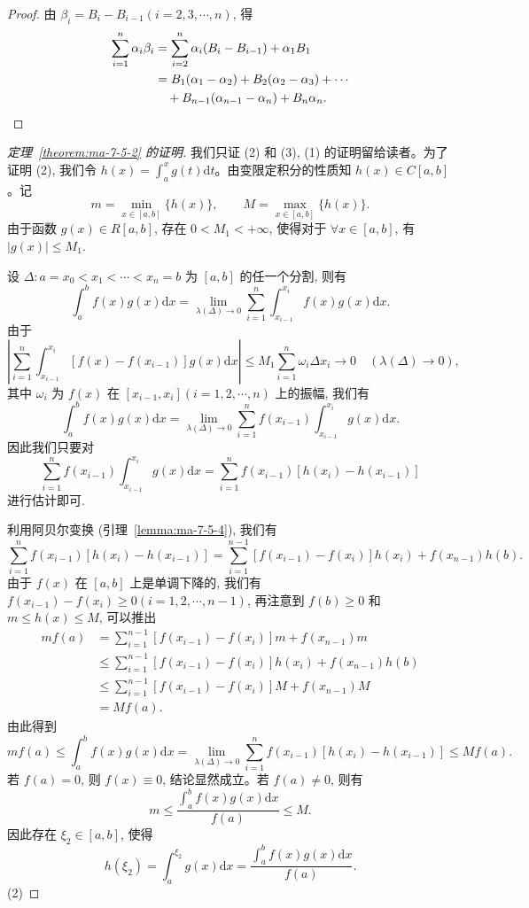 \begin{proof}
由 $\beta_i=B_i-B_{i-1}(i=2,3,\cdots,n)$, 得
\[
\begin{aligned}
  \sum_{i=1}^n\alpha_i\beta_i
  &=\sum_{i=2}^n\alpha_i(B_i-B_{i-1})+\alpha_1B_1\\
  &=B_1(\alpha_1-\alpha_2)+B_2(\alpha_2-\alpha_3)+\cdots\\
  &\quad+B_{n-1}(\alpha_{n-1}-\alpha_n)+B_n\alpha_n.
\end{aligned}
\qedhere
\]
\end{proof}


\begin{proof}[{定理~\ref{theorem:ma-7-5-2} 的证明}]
我们只证 (2) 和 (3), (1) 的证明留给读者。为了证明 (2), 我们令 $h(x)=\int_a^x g(t)\mathrm dt$。由变限定积分的性质知 $h(x)\in C[a,b]$。记
\[
  m=\min_{x\in[a,b]}\{h(x)\},\qquad
  M=\max_{x\in[a,b]}\{h(x)\}.
\]
由于函数 $g(x)\in R[a,b]$, 存在 $0<M_1<+\infty$, 使得对于 $\forall x\in[a,b]$, 有 $|g(x)|\leq M_1$.

设 $\Delta:a=x_0<x_1<\cdots<x_n=b$ 为 $[a,b]$ 的任一个分割, 则有
\[
  \int_a^b f(x)g(x)\mathrm dx
  =\lim_{\lambda(\Delta)\to0}\sum_{i=1}^n\int_{x_{i-1}}^{x_i} f(x)g(x)\mathrm dx.
\]
由于
\[
  \left|\sum_{i=1}^n\int_{x_{i-1}}^{x_i}[f(x)-f(x_{i-1})]g(x)\mathrm dx\right|
  \leq M_1\sum_{i=1}^n\omega_i\Delta x_i\to0\quad(\lambda(\Delta)\to0),
\]
其中 $\omega_i$ 为 $f(x)$ 在 $[x_{i-1},x_i](i=1,2,\cdots,n)$ 上的振幅, 我们有
\[
  \int_a^b f(x)g(x)\mathrm dx
  =\lim_{\lambda(\Delta)\to0}\sum_{i=1}^n f(x_{i-1})\int_{x_{i-1}}^{x_i}g(x)\mathrm dx.
\]
因此我们只要对
\[
  \sum_{i=1}^n f(x_{i-1})\int_{x_{i-1}}^{x_i}g(x)\mathrm dx
  =\sum_{i=1}^n f(x_{i-1})[h(x_i)-h(x_{i-1})]
\]
进行估计即可.

利用阿贝尔变换 (引理~\ref{lemma:ma-7-5-4}), 我们有
\[
\sum_{i=1}^n f(x_{i-1})[h(x_i)-h(x_{i-1})]
=\sum_{i=1}^{n-1}[f(x_{i-1})-f(x_i)]h(x_i)+f(x_{n-1})h(b).
\]
由于 $f(x)$ 在 $[a,b]$ 上是单调下降的, 我们有 $f(x_{i-1})-f(x_i)\geq0(i=1,2,\cdots,n-1)$, 再注意到 $f(b)\geq0$ 和 $m\leq h(x)\leq M$, 可以推出
\[
\begin{aligned}
  mf(a)&=\sum_{i=1}^{n-1}[f(x_{i-1})-f(x_i)]m+f(x_{n-1})m\\
  &\leq\sum_{i=1}^{n-1}[f(x_{i-1})-f(x_i)]h(x_i)+f(x_{n-1})h(b)\\
  &\leq\sum_{i=1}^{n-1}[f(x_{i-1})-f(x_i)]M+f(x_{n-1})M\\
  &=Mf(a).
\end{aligned}
\]
由此得到
\[
  mf(a)\leq\int_a^b f(x)g(x)\mathrm dx
  =\lim_{\lambda(\Delta)\to0}\sum_{i=1}^n f(x_{i-1})[h(x_i)-h(x_{i-1})]\leq Mf(a).
\]
若 $f(a)=0$, 则 $f(x)\equiv0$, 结论显然成立。若 $f(a)\neq0$, 则有
\[
  m\leq\frac{\int_a^b f(x)g(x)\mathrm dx}{f(a)}\leq M.
\]
因此存在 $\xi_2\in[a,b]$, 使得
\[
  h(\xi_2)=\int_a^{\xi_2}g(x)\mathrm dx
  =\frac{\int_a^b f(x)g(x)\mathrm dx}{f(a)}.
\]
(2)
\end{proof}


